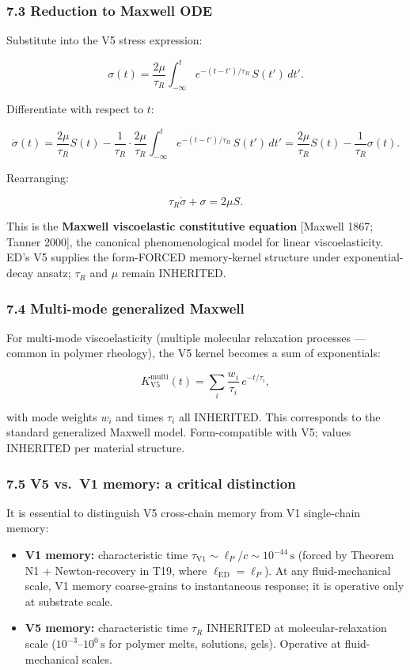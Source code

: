 \documentclass[
  11pt,a4paper]{article}
\providecommand{\tightlist}{%
  \setlength{\itemsep}{0pt}\setlength{\parskip}{0pt}}
\begin{document}
\subsubsection{7.3 Reduction to Maxwell
ODE}\label{reduction-to-maxwell-ode}

Substitute into the V5 stress expression:

\[\sigma(t) = \frac{2\mu}{\tau_R} \int_{-\infty}^t e^{-(t-t')/\tau_R} \, S(t') \, dt'.\]

Differentiate with respect to \(t\):

\[\dot\sigma(t) = \frac{2\mu}{\tau_R} S(t) - \frac{1}{\tau_R} \cdot \frac{2\mu}{\tau_R} \int_{-\infty}^t e^{-(t-t')/\tau_R} \, S(t') \, dt' = \frac{2\mu}{\tau_R} S(t) - \frac{1}{\tau_R} \sigma(t).\]

Rearranging:

\[\boxed{\;\tau_R \dot\sigma + \sigma = 2\mu S.\;}\]

This is the \textbf{Maxwell viscoelastic constitutive equation}
{[}Maxwell 1867; Tanner 2000{]}, the canonical phenomenological model
for linear viscoelasticity. ED's V5 supplies the form-FORCED
memory-kernel structure under exponential-decay ansatz; \(\tau_R\) and
\(\mu\) remain INHERITED.

\subsubsection{7.4 Multi-mode generalized
Maxwell}\label{multi-mode-generalized-maxwell}

For multi-mode viscoelasticity (multiple molecular relaxation processes
--- common in polymer rheology), the V5 kernel becomes a sum of
exponentials:

\[K_\mathrm{V5}^\mathrm{multi}(t) = \sum_i \frac{w_i}{\tau_i} \, e^{-t/\tau_i},\]

with mode weights \(w_i\) and times \(\tau_i\) all INHERITED. This
corresponds to the standard generalized Maxwell model. Form-compatible
with V5; values INHERITED per material structure.

\subsubsection{7.5 V5 vs.~V1 memory: a critical
distinction}\label{v5-vs.-v1-memory-a-critical-distinction}

It is essential to distinguish V5 cross-chain memory from V1
single-chain memory:

\begin{itemize}
\tightlist
\item
  \textbf{V1 memory:} characteristic time
  \(\tau_\mathrm{V1} \sim \ell_P/c \sim 10^{-44}\,\mathrm{s}\) (forced
  by Theorem N1 + Newton-recovery in T19, where
  \(\ell_\mathrm{ED} = \ell_P\)). At any fluid-mechanical scale, V1
  memory coarse-grains to instantaneous response; it is operative only
  at substrate scale.
\item
  \textbf{V5 memory:} characteristic time \(\tau_R\) INHERITED at
  molecular-relaxation scale (\(10^{-3}\)--\(10^0\,\mathrm{s}\) for
  polymer melts, solutions, gels). Operative at fluid-mechanical scales.
\end{itemize}
\end{document}
